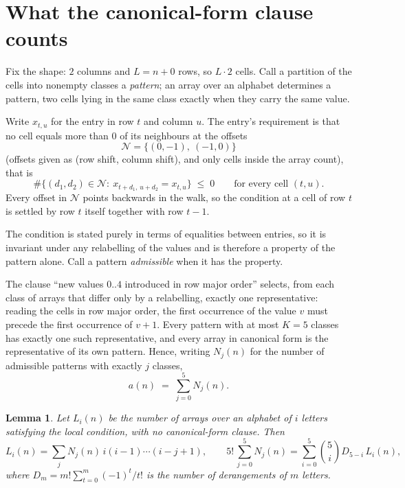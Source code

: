 \documentclass[11pt,a4paper]{article}
\theoremstyle{plain}
\newtheorem{lemma}[theorem]{Lemma}
\theoremstyle{definition}
\begin{document}
\section{What the canonical-form clause counts}

Fix the shape: $2$ columns and $L=n+0$ rows, so $L\cdot2$ cells. Call a
partition of the cells into nonempty classes a \emph{pattern}; an array over an alphabet
determines a pattern, two cells lying in the same class exactly when they carry the same
value.

Write $x_{t,u}$ for the entry in row $t$ and column $u$. The
entry's requirement is that no cell equals more than $0$ of its neighbours at the
offsets
\[
\mathcal N=\{(0,-1),\ (-1,0)\}
\]
(offsets given as (row shift, column shift), and only cells inside the array count),
that is
\begin{equation}\label{eq:loc}
\#\bigl\{(d_1,d_2)\in\mathcal N:\ x_{t+d_1,\,u+d_2}=x_{t,u}\bigr\}\;\le\;0
\qquad\text{for every cell }(t,u).
\end{equation}
Every offset in $\mathcal N$ points backwards in the walk, so the condition at a cell of
row $t$ is settled by row $t$ itself together with row $t-1$.

The condition is stated purely in terms of equalities between entries, so it is invariant
under any relabelling of the values and is therefore a property of the pattern alone. Call a
pattern \emph{admissible} when it has the property.

The clause ``new values $0..4$ introduced in row major order'' selects, from each class
of arrays that differ only by a relabelling, exactly one representative: reading the cells in
row major order, the first occurrence of the value $v$ must precede the first occurrence of
$v+1$. Every pattern with at most $K=5$ classes has exactly one such representative, and
every array in canonical form is the representative of its own pattern. Hence, writing
$N_j(n)$ for the number of admissible patterns with exactly $j$ classes,
\begin{equation}\label{eq:apat}
a(n)\;=\;\sum_{j=0}^{5}N_j(n).
\end{equation}

\begin{lemma}\label{lem:inv}
Let $L_i(n)$ be the number of arrays over an alphabet of $i$ letters satisfying the local
condition, with no canonical-form clause. Then
\[
L_i(n)=\sum_j N_j(n)\,i(i-1)\cdots(i-j+1),
\qquad
5!\,\sum_{j=0}^{5}N_j(n)=\sum_{i=0}^{5}\binom{5}{i}D_{5-i}\,L_i(n),
\]
where $D_m=m!\sum_{t=0}^{m}(-1)^t/t!$ is the number of derangements of $m$ letters.
\end{lemma}
\end{document}
